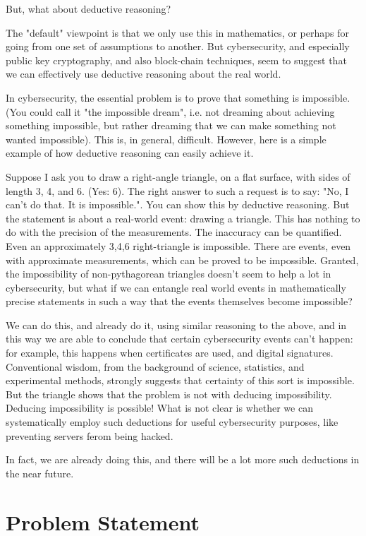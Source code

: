 \documentclass[journal]{IEEEtran}
\begin{document}
But, what about deductive reasoning?

The "default" viewpoint is that we only use this in mathematics,
or perhaps for going from one set of assumptions to another. But
cybersecurity, and especially public key cryptography, and also
block-chain techniques, seem to suggest that we can effectively use
deductive reasoning about the real world.

In cybersecurity, the essential problem is to prove that something is
impossible. (You could call it "the impossible dream", i.e. not dreaming
about achieving something impossible, but rather dreaming that we can make
something not wanted impossible). This is, in general, difficult. However,
here is a simple example of how deductive reasoning can easily achieve it.

Suppose I ask you to draw a right-angle triangle, on a flat surface, with
sides of length 3, 4, and 6. (Yes: 6). The right answer to such a request
is to say: "No, I can't do that. It is impossible.". You can show this
by deductive reasoning. But the statement is about a real-world event:
drawing a triangle. This has nothing to do with the precision of the
measurements. The inaccuracy can be quantified. Even an approximately
3,4,6 right-triangle is impossible. There are events, even with
approximate measurements, which can be proved to be impossible. Granted,
the impossibility of non-pythagorean triangles doesn't seem to help a
lot in cybersecurity, but what if we can entangle real world events in
mathematically precise statements in such a way that the events themselves
become impossible?

We can do this, and already do it, using similar reasoning to the above,
and in this way we are able to conclude that certain cybersecurity events can't happen: for
example, this happens when certificates are used, and digital
signatures. Conventional wisdom, from the background of science,
statistics, and experimental methods, strongly suggests that certainty
of this sort is impossible. But the triangle shows that the problem is
not with deducing impossibility. Deducing impossibility is possible! What
is not clear is whether we can systematically employ such deductions for useful
cybersecurity purposes, like preventing servers ferom being hacked.

In fact, we are already doing this, and there will be a lot more such
deductions in the near future.

\section{Problem Statement}
\end{document}
